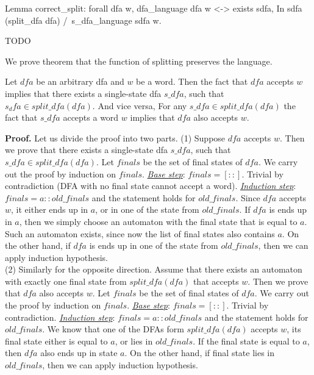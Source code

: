 



\begin{listing}[h]
    \begin{pyglist}[language=coq, numbers=none, numbersep=5pt]
  Lemma correct_split:
    forall dfa w,
      dfa_language dfa w <->
      exists sdfa, 
         In sdfa (split_dfa dfa) /\ 
         s_dfa_language sdfa w.
    \end{pyglist}
    \caption{TODO}
    \label{lst:verbments1}
\end{listing}

We prove theorem that the function of splitting preserves the language.

\begin{theorem}
  Let $dfa$ be an arbitrary dfa and $w$ be a word. Then the fact that $dfa$ accepts $w$ implies that there exists a single-state dfa $s\_dfa$, such that $s_dfa \in split\_dfa(dfa)$. And vice versa, For any $s\_dfa \in split\_dfa(dfa)$ the fact that $s\_dfa$ accepts a word $w$ implies that $dfa$ also accepts $w$.
\end{theorem}

\textbf{Proof.}
Let us divide the proof into two parts.
(1) Suppose $dfa$ accepts $w$. Then we prove that there exists a single-state dfa $s\_dfa$, such that $s\_dfa \in split\_dfa(dfa)$. 
Let $finals$ be the set of final states of $dfa$. We carry out the proof by induction on $finals$. 
\textit{\underline{Base step}}: $finals = [::]$. Trivial by contradiction (DFA with no final state cannot accept a word). \textit{\underline{Induction step}}: $finals = a::old\_finals$ and the statement holds for $old\_finals$. Since $dfa$ accepts $w$, it either ends up in $a$, or in one of the state from $old\_finals$.
If $dfa$ is ends up in $a$, then we simply choose an automaton with the final state that is equal to $a$. Such an automaton exists, since now the list of final states also contains $a$. On the other hand, if $dfa$ is ends up in one of the state from $old\_finals$, then we can apply induction hypothesis. \\
(2) Similarly for the opposite direction. Assume that there exists an automaton with exactly one final state from $split\_dfa(dfa)$ that accepts $w$. Then we prove that $dfa$ also accepts $w$. 
Let $finals$ be the set of final states of $dfa$. We carry out the proof by induction on $finals$. 
\textit{\underline{Base step}}: $finals = [::]$. Trivial by contradiction. \textit{\underline{Induction step}}: $finals = a::old\_finals$ and the statement holds for $old\_finals$. We know that one of the DFAs form $split\_dfa(dfa)$ accepts $w$, its final state either is equal to $a$, or lies in $old\_finals$.
If the final state is equal to $a$, then $dfa$ also ends up in state $a$.  On the other hand, if final state lies in $old\_finals$, then we can apply induction hypothesis.


